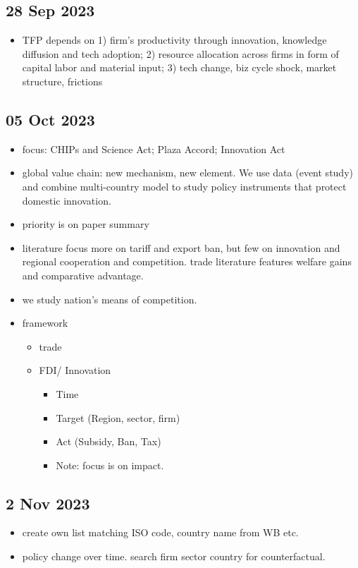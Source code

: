 	\subsection{28 Sep 2023}
		\begin{itemize}
			\item TFP depends on 1) firm's productivity through innovation, knowledge diffusion and tech adoption; 2) resource allocation across firms in form of capital labor and material input; 3) tech change, biz cycle shock, market structure, frictions
		\end{itemize}
	
	\subsection{05 Oct 2023}
		\begin{itemize}
		\item focus: CHIPs and Science Act; Plaza Accord; Innovation Act
		\item global value chain: new mechanism, new element. We use data (event study) and combine multi-country model to study policy instruments that protect domestic innovation.
		\item priority is on paper summary
		\item literature focus more on tariff and export ban, but few on innovation and regional cooperation and competition. trade literature features welfare gains and comparative advantage.
		\item we study nation's means of competition.
		\item framework
			\begin{itemize}
			\item trade
			\item FDI/ Innovation
				\begin{itemize}
				\item Time
				\item Target (Region, sector, firm)
				\item Act (Subsidy, Ban, Tax)
				\item Note: focus is on impact.
				\end{itemize}
			\end{itemize}
		\end{itemize}
	\subsection{2 Nov 2023}
		\begin{itemize}
		\item create own list matching ISO code, country name from WB etc.
		\item policy change over time. search firm sector country for counterfactual.
		\end{itemize}
